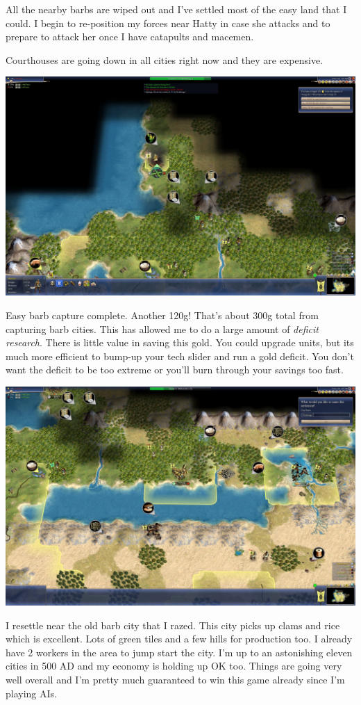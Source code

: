 \documentclass[10pt]{article}
\begin{document}
All the nearby barbs are wiped out and I've settled most of the easy land that I could. I begin to re-position my forces
near Hatty in case she attacks and to prepare to attack her once I have catapults and macemen.

Courthouses are going down in all cities right now and they are expensive.

\includegraphics[width=1.0\textwidth]{105}

Easy barb capture complete. Another 120g! That's about 300g total from capturing barb cities. This has allowed
me to do a large amount of \emph{deficit research}. There is little value in saving this gold. You could upgrade units,
but its much more efficient to bump-up your tech slider and run a gold deficit. You don't want the deficit to be
too extreme or you'll burn through your savings too fast.

\includegraphics[width=1.0\textwidth]{106}

I resettle near the old barb city that I razed. This city picks up clams and rice which is excellent. Lots of green tiles
and a few hills for production too. I already have 2 workers in the area to jump start the city. I'm up to an astonishing
eleven cities in 500 AD and my economy is holding up OK too. Things are going very well overall and I'm pretty much
guaranteed to win this game already since I'm playing AIs.
\end{document}
